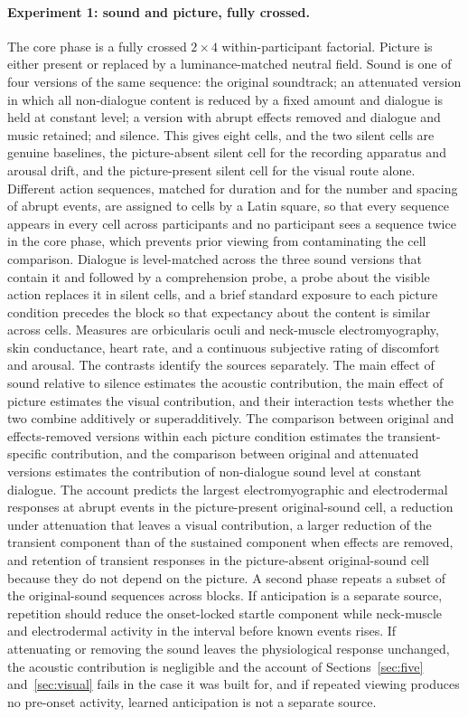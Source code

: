 \documentclass[11pt]{article}
\theoremstyle{plain}
\theoremstyle{definition}
\begin{document}
\paragraph{Experiment 1: sound and picture, fully crossed.}
The core phase is a fully crossed $2\times 4$ within-participant factorial. Picture is either present or replaced by a luminance-matched neutral field. Sound is one of four versions of the same sequence: the original soundtrack; an attenuated version in which all non-dialogue content is reduced by a fixed amount and dialogue is held at constant level; a version with abrupt effects removed and dialogue and music retained; and silence. This gives eight cells, and the two silent cells are genuine baselines, the picture-absent silent cell for the recording apparatus and arousal drift, and the picture-present silent cell for the visual route alone. Different action sequences, matched for duration and for the number and spacing of abrupt events, are assigned to cells by a Latin square, so that every sequence appears in every cell across participants and no participant sees a sequence twice in the core phase, which prevents prior viewing from contaminating the cell comparison. Dialogue is level-matched across the three sound versions that contain it and followed by a comprehension probe, a probe about the visible action replaces it in silent cells, and a brief standard exposure to each picture condition precedes the block so that expectancy about the content is similar across cells. Measures are orbicularis oculi and neck-muscle electromyography, skin conductance, heart rate, and a continuous subjective rating of discomfort and arousal. The contrasts identify the sources separately. The main effect of sound relative to silence estimates the acoustic contribution, the main effect of picture estimates the visual contribution, and their interaction tests whether the two combine additively or superadditively. The comparison between original and effects-removed versions within each picture condition estimates the transient-specific contribution, and the comparison between original and attenuated versions estimates the contribution of non-dialogue sound level at constant dialogue. The account predicts the largest electromyographic and electrodermal responses at abrupt events in the picture-present original-sound cell, a reduction under attenuation that leaves a visual contribution, a larger reduction of the transient component than of the sustained component when effects are removed, and retention of transient responses in the picture-absent original-sound cell because they do not depend on the picture. A second phase repeats a subset of the original-sound sequences across blocks. If anticipation is a separate source, repetition should reduce the onset-locked startle component while neck-muscle and electrodermal activity in the interval before known events rises. If attenuating or removing the sound leaves the physiological response unchanged, the acoustic contribution is negligible and the account of Sections~\ref{sec:five} and~\ref{sec:visual} fails in the case it was built for, and if repeated viewing produces no pre-onset activity, learned anticipation is not a separate source.
\end{document}

